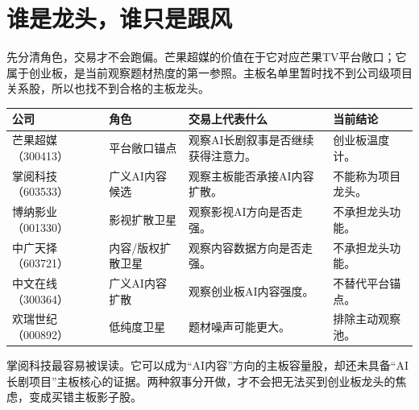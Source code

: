 \section{谁是龙头，谁只是跟风}

先分清角色，交易才不会跑偏。芒果超媒的价值在于它对应芒果TV平台敞口；它属于创业板，是当前观察题材热度的第一参照。主板名单里暂时找不到公司级项目关系股，所以也找不到合格的主板龙头。

\begin{exhibitbox}[展品：候选股分层]
\begin{tabularx}{\textwidth}{L{2.7cm}L{2.7cm}X L{2.2cm}}
\toprule
公司 & 角色 & 交易上代表什么 & 当前结论 \\
\midrule
芒果超媒（300413） & 平台敞口锚点 & 观察AI长剧叙事是否继续获得注意力。 & 创业板温度计。 \\
掌阅科技（603533） & 广义AI内容候选 & 观察主板能否承接AI内容扩散。 & 不能称为项目龙头。 \\
博纳影业（001330） & 影视扩散卫星 & 观察影视AI方向是否走强。 & 不承担龙头功能。 \\
中广天择（603721） & 内容/版权扩散卫星 & 观察内容数据方向是否走强。 & 不承担龙头功能。 \\
中文在线（300364） & 广义AI内容扩散 & 观察创业板AI内容强度。 & 不替代平台锚点。 \\
欢瑞世纪（000892） & 低纯度卫星 & 题材噪声可能更大。 & 排除主动观察池。 \\
\bottomrule
\end{tabularx}
\end{exhibitbox}

掌阅科技最容易被误读。它可以成为“AI内容”方向的主板容量股，却还未具备“AI长剧项目”主板核心的证据。两种叙事分开做，才不会把无法买到创业板龙头的焦虑，变成买错主板影子股。
